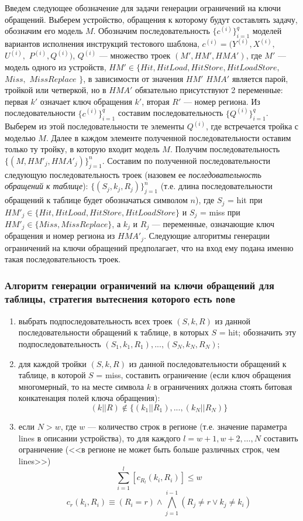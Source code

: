 Введем следующее обозначение для задачи генерации ограничений на ключи обращений. Выберем устройство, обращения к которому будут составлять задачу, обозначим его модель $M$. Обозначим  последовательность $\{c^{(i)}\}_{i=1}^q$ моделей вариантов исполнения инструкций тестового шаблона, $c^{(i)} = (Y^{(i)}, X^{(i)},$ $U^{(i)},$ $P^{(i)}, Q^{(i)})$, $Q^{(i)}$ --- множество троек $(M', HM', HMA')$, где $M'$ --- модель одного из устройств, $HM' \in \{Hit, HitLoad, HitStore, HitLoadStore,$ $Miss,$ $MissReplace$ $\}$, в зависимости от значения $HM'$ $HMA'$ является парой, тройкой или четверкой, но в $HMA'$ обязательно присутствуют 2 переменные: первая $k'$ означает ключ обращения $k'$, вторая $R'$ --- номер региона. Из последовательности $\{c^{(i)}\}_{i=1}^q$ составим последовательность $\{Q^{(i)}\}_{i=1}^q$. Выберем из этой последовательности те элементы $Q^{(i)}$, где встречается тройка с моделью $M$. Далее в каждом элементе полученной последовательности оставим только ту тройку, в которую входит модель $M$. Получим последовательность $\{(M, HM'_j, HMA'_j)\}_{j=1}^n$. Составим по полученной последовательности следующую последовательность троек (назовем ее \emph{последовательность обращений к таблице}): $\{(S_j, k_j, R_j)\}_{j=1}^n$ (т.е. длина последовательности обращений к таблице будет обозначаться символом $n$), где $S_j$ = hit при $HM'_j \in \{Hit, HitLoad, HitStore, HitLoadStore\}$ и $S_j$ = miss при $HM'_j \in \{Miss, MissReplace\}$, а $k_j$ и $R_j$ --- переменные, означающие ключ обращения и номер региона из $HMA'_j$. Следующие алгоритмы генерации ограничений на ключи обращений предполагает, что на вход ему подана именно такая последовательность троек.

\subsubsection*{Алгоритм генерации ограничений на ключи обращений для таблицы, стратегия вытеснения которого есть \texttt{none}}

\begin{enumerate}
    \item выбрать подпоследовательность всех троек $(S, k, R)$ из данной последовательности обращений к таблице, в которых $S$ = hit; обозначить эту подпоследовательность $(S_1, k_1, R_1), ..., (S_N, k_N, R_N)$;
    \item для каждой тройки $(S, k, R)$ из данной последовательности обращений к таблице, в которой $S$ = miss, составить ограничение (если ключ обращения многомерный, то на месте символа $k$ в ограничениях должна стоять битовая конкатенация полей ключа обращения): $$(k||R) \notin \{(k_1||R_1), ..., (k_N||R_N)\}$$
    \item если $N > w$, где $w$ --- количество строк в регионе (т.е. значение параметра lines в описании устройства), то для каждого $l = w+1, w+2, \dots, N$ составить ограничение (<<в регионе не может быть больше различных строк, чем lines>>)
$$\sum_{i=1}^l [c_{R_l} (k_i, R_i)] \leqslant w$$
$$c_r (k_i, R_i) \equiv (R_i = r) \wedge \bigwedge_{j=1}^{i-1} (R_j \neq r \vee k_j \neq k_i)$$
\end{enumerate}

